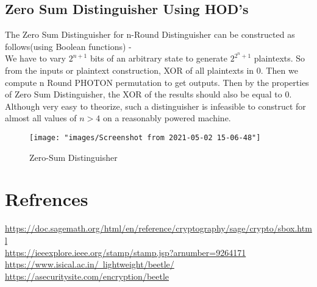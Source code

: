 \documentclass{article}
\begin{document}
\subsection{Zero Sum Distinguisher Using HOD’s}
 The Zero Sum Distinguisher for n-Round Distinguisher can be constructed as follows(using Boolean functions) -\\
We have to vary $2^{n+1}$ bits of an arbitrary state to generate $2^{2^n+1}$ plaintexts. So from the inputs or plaintext construction, XOR of all plaintexts in 0. Then we compute n Round PHOTON permutation to get outputs. Then by
the properties of Zero Sum Distinguisher, the XOR of the results should also be equal to 0. 
Although very easy to theorize, such a distinguisher is infeasible to construct for almost all
values of $n > 4$ on a reasonably powered machine.
\begin{figure}
	\centering
	\texttt{[image: "images/Screenshot from 2021-05-02 15-06-48"]}
	\caption{Zero-Sum Distinguisher}
	\label{fig:screenshot-from-2021-05-02-15-06-48}
\end{figure}
\newpage
\section{Refrences}
\href{https://doc.sagemath.org/html/en/reference/cryptography/sage/crypto/sbox.html
}{https://doc.sagemath.org/html/en/reference/cryptography/sage/crypto/sbox.html
}\\
\href{https://ieeexplore.ieee.org/stamp/stamp.jsp?arnumber=9264171
}{https://ieeexplore.ieee.org/stamp/stamp.jsp?arnumber=9264171
}\\
\href{https://www.isical.ac.in/~lightweight/beetle/}{https://www.isical.ac.in/~lightweight/beetle/}\\
\href{https://asecuritysite.com/encryption/beetle}{https://asecuritysite.com/encryption/beetle}
\end{document}
